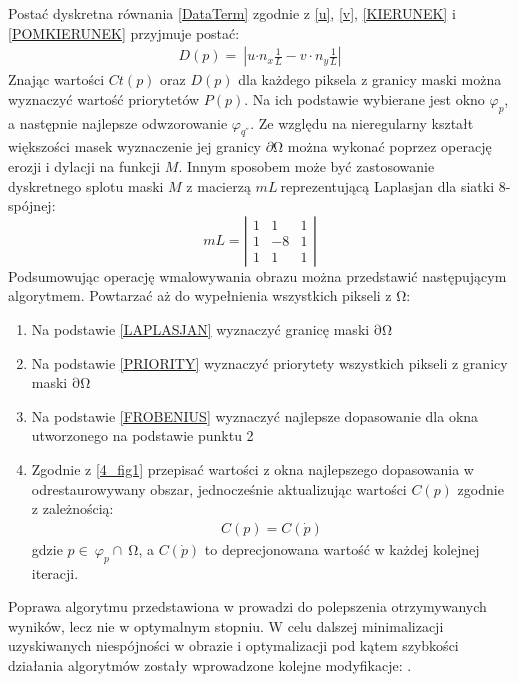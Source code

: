 \documentclass[12pt, twoside, openany]{report}
\theoremstyle{definition}
\begin{document}
Postać dyskretna równania \eqref{DataTerm} zgodnie z \eqref{u}, \eqref{v}, \eqref{KIERUNEK} i \eqref{POMKIERUNEK} przyjmuje postać:
\begin{align}
D(p)=\ \left|u{\cdot n}_x\frac{1}{L}-v\cdot n_y\frac{1}{L}\right|
\end{align}
Znając wartości $Ct\left(p\right)$ oraz $D(p)$ dla każdego piksela z granicy maski można wyznaczyć wartość priorytetów $P(p)$. Na ich podstawie wybierane jest okno ${\varphi }_p$, a następnie najlepsze odwzorowanie ${\varphi }_{q^{''}}$. Ze względu na nieregularny kształt większości masek wyznaczenie jej granicy $\partial \mathrm{\Omega }$ można wykonać poprzez operację erozji i dylacji na funkcji $M$. Innym sposobem może być zastosowanie dyskretnego splotu maski $M$ z macierzą $mL\ $reprezentującą Laplasjan dla siatki 8-spójnej: 
\begin{equation}
mL=\left| \begin{array}{ccc}
1 & 1 & 1 \\ 
1 & -8 & 1 \\ 
1 & 1 & 1 \end{array}
\right|	
\label{LAPLASJAN}
\end{equation}
Podsumowując operację wmalowywania obrazu można przedstawić następującym algorytmem. Powtarzać aż do wypełnienia wszystkich pikseli z $\mathrm{\Omega }$:
\begin{enumerate}
\item
Na podstawie \eqref{LAPLASJAN} wyznaczyć granicę maski $\mathrm{\partial }\mathrm{\Omega }$
\item
Na podstawie \eqref{PRIORITY} wyznaczyć priorytety wszystkich pikseli z granicy maski $\mathrm{\partial }\mathrm{\Omega }$
\item
Na podstawie \eqref{FROBENIUS} wyznaczyć najlepsze dopasowanie dla okna utworzonego na podstawie punktu 2 
\item
Zgodnie z \autoref{4_fig1} przepisać wartości z okna najlepszego dopasowania w odrestaurowywany obszar, jednocześnie aktualizując wartości $C(p)$ zgodnie z zależnością:
\begin{align}
C\left(p\right)=C\left(\dot{p}\right)
\end{align} 
gdzie $p\in \ {\varphi }_p\cap \ \mathrm{\Omega }$, a $C\left(\dot{p}\right)$ to deprecjonowana wartość w każdej kolejnej iteracji.
\end{enumerate}
Poprawa algorytmu przedstawiona w \cite{criminisi2004region} prowadzi do polepszenia otrzymywanych wyników, lecz nie w optymalnym stopniu. W celu dalszej minimalizacji uzyskiwanych niespójności w obrazie i optymalizacji pod kątem szybkości działania algorytmów zostały wprowadzone kolejne modyfikacje: \cite{StructurePropagationManual} \cite{malluvalasaimplementation} \cite{SalientStrucTexProp}. 
\end{document}
